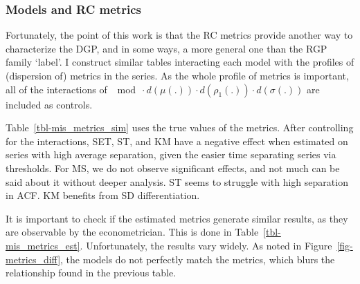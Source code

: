 \documentclass[
  letterpaper,
  DIV=11,
  numbers=noendperiod]{scrartcl}
\numberwithin{equation}{section}
\numberwithin{table}{section}
\numberwithin{figure}{section}
\begin{document}
\subsubsection{Models and RC metrics}\label{models-and-rc-metrics}

Fortunately, the point of this work is that the RC metrics provide
another way to characterize the DGP, and in some ways, a more general
one than the RGP family `label'. I construct similar tables interacting
each model with the profiles of (dispersion of) metrics in the series.
As the whole profile of metrics is important, all of the interactions of
\(\mod \cdot d(\mu(.)) \cdot d(\rho_1(.)) \cdot d(\sigma(.))\) are
included as controls.

Table~\ref{tbl-mis_metrics_sim} uses the true values of the metrics.
After controlling for the interactions, SET, ST, and KM have a negative
effect when estimated on series with high average separation, given the
easier time separating series via thresholds. For MS, we do not observe
significant effects, and not much can be said about it without deeper
analysis. ST seems to struggle with high separation in ACF. KM benefits
from SD differentiation.

\begin{table}[!htbp]

\caption{\label{tbl-mis_metrics_sim}Models and true RC metrics}

\centering{



}

\end{table}%

It is important to check if the estimated metrics generate similar
results, as they are observable by the econometrician. This is done in
Table~\ref{tbl-mis_metrics_est}. Unfortunately, the results vary widely.
As noted in Figure~\ref{fig-metrics_diff}, the models do not perfectly
match the metrics, which blurs the relationship found in the previous
table.

\begin{table}[!htbp]

\caption{\label{tbl-mis_metrics_est}Models and estimated RC metrics}

\centering{



}

\end{table}%
\end{document}
